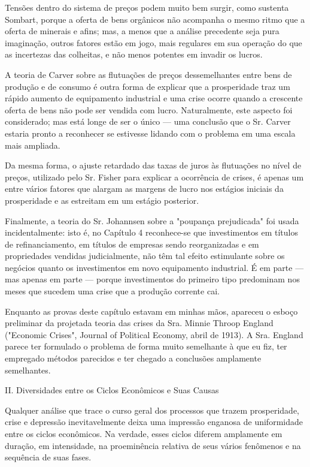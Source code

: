 \documentclass[12pt]{article}
\begin{document}
Tensões dentro do sistema de preços podem muito bem surgir, como sustenta Sombart, porque a oferta de bens orgânicos não acompanha o mesmo ritmo que a oferta de minerais e afins; mas, a menos que a análise precedente seja pura imaginação, outros fatores estão em jogo, mais regulares em sua operação do que as incertezas das colheitas, e não menos potentes em invadir os lucros.

A teoria de Carver sobre as flutuações de preços dessemelhantes entre bens de produção e de consumo é outra forma de explicar que a prosperidade traz um rápido aumento de equipamento industrial e uma crise ocorre quando a crescente oferta de bens não pode ser vendida com lucro. Naturalmente, este aspecto foi considerado; mas está longe de ser o único — uma conclusão que o Sr. Carver estaria pronto a reconhecer se estivesse lidando com o problema em uma escala mais ampliada.

Da mesma forma, o ajuste retardado das taxas de juros às flutuações no nível de preços, utilizado pelo Sr. Fisher para explicar a ocorrência de crises, é apenas um entre vários fatores que alargam as margens de lucro nos estágios iniciais da prosperidade e as estreitam em um estágio posterior.

Finalmente, a teoria do Sr. Johannsen sobre a "poupança prejudicada" foi usada incidentalmente: isto é, no Capítulo 4 reconhece-se que investimentos em títulos de refinanciamento, em títulos de empresas sendo reorganizadas e em propriedades vendidas judicialmente, não têm tal efeito estimulante sobre os negócios quanto os investimentos em novo equipamento industrial. É em parte — mas apenas em parte — porque investimentos do primeiro tipo predominam nos meses que sucedem uma crise que a produção corrente cai.

Enquanto as provas deste capítulo estavam em minhas mãos, apareceu o esboço preliminar da projetada teoria das crises da Sra. Minnie Throop England ("Economic Crises", Journal of Political Economy, abril de 1913). A Sra. England parece ter formulado o problema de forma muito semelhante à que eu fiz, ter empregado métodos parecidos e ter chegado a conclusões amplamente semelhantes.

II. Diversidades entre os Ciclos Econômicos e Suas Causas

Qualquer análise que trace o curso geral dos processos que trazem prosperidade, crise e depressão inevitavelmente deixa uma impressão enganosa de uniformidade entre os ciclos econômicos. Na verdade, esses ciclos diferem amplamente em duração, em intensidade, na proeminência relativa de seus vários fenômenos e na sequência de suas fases.
\end{document}
